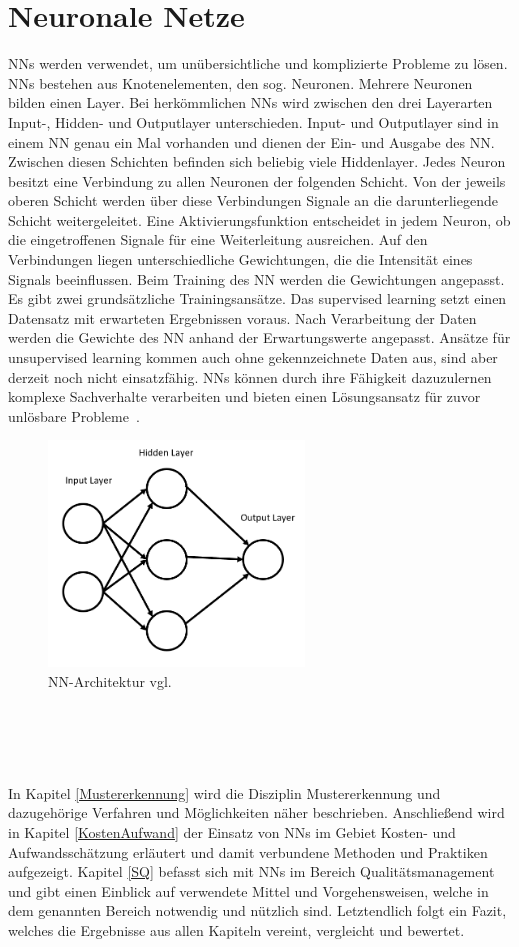 \section*{Neuronale Netze}
NNs werden verwendet, um unübersichtliche und komplizierte Probleme zu lösen. NNs bestehen aus Knotenelementen, den sog. Neuronen. Mehrere Neuronen bilden einen Layer. Bei herkömmlichen NNs wird zwischen den drei Layerarten Input-, Hidden- und Outputlayer unterschieden. Input- und Outputlayer sind in einem NN genau ein Mal vorhanden und dienen der Ein- und Ausgabe des NN. Zwischen diesen Schichten befinden sich beliebig viele Hiddenlayer. Jedes Neuron besitzt eine Verbindung zu allen Neuronen der folgenden Schicht. Von der jeweils oberen Schicht werden über diese Verbindungen Signale an die darunterliegende Schicht weitergeleitet. Eine Aktivierungsfunktion entscheidet in jedem Neuron, ob die eingetroffenen Signale für eine Weiterleitung ausreichen. Auf den Verbindungen liegen unterschiedliche Gewichtungen, die die Intensität eines Signals be\-einflussen. Beim Training des NN werden die Gewichtungen angepasst.
Es gibt zwei grundsätzliche Trainingsansätze. Das supervised learning setzt einen Datensatz mit erwarteten Ergebnissen voraus. Nach Verarbeitung der Daten werden die Gewichte des NN anhand der Erwartungswerte angepasst. Ansätze für unsupervised learning kommen auch ohne gekennzeichnete Daten aus, sind aber derzeit noch nicht einsatzfähig. NNs können durch ihre Fähigkeit dazuzulernen komplexe Sachverhalte verarbeiten und bieten einen Lösungsansatz für zuvor unlösbare Probleme~\cite{Maind2014}.\\
\begin{figure}[h]
\includegraphics[width=\linewidth, height=6cm]{Bilder/NN/NeuralNetwork.png}
\caption{NN-Architektur vgl.~\cite{Maind2014}}
\end{figure}
\\
\\
\\
\\
In Kapitel \ref{Mustererkennung} wird die Disziplin Mustererkennung und dazugehörige Verfahren und Möglichkeiten näher beschrieben. Anschließend wird in Kapitel \ref{KostenAufwand} der Einsatz von NNs im Gebiet Kosten- und Aufwandsschätzung erläutert und damit verbundene Methoden und Praktiken aufgezeigt. Kapitel \ref{SQ} befasst sich mit NNs im Bereich Qualitätsmanagement und gibt einen Einblick auf verwendete Mittel und Vorgehensweisen, welche in dem genannten Bereich notwendig und nützlich sind. Letztendlich folgt ein Fazit, welches die Ergebnisse aus allen Kapiteln vereint, vergleicht und bewertet.